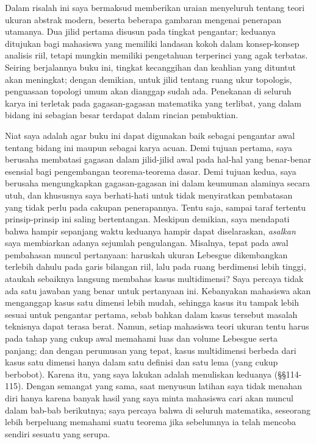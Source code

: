 \def\volumename{Landasan yang luas}
     
\bigskip
     
 Dalam risalah ini saya bermaksud memberikan
uraian menyeluruh tentang teori ukuran abstrak modern, beserta beberapa
gambaran mengenai penerapan utamanya.   Dua jilid pertama disusun pada
tingkat pengantar;  keduanya ditujukan bagi mahasiswa yang memiliki
landasan kokoh dalam konsep-konsep analisis riil, tetapi mungkin memiliki
pengetahuan terperinci yang agak terbatas.    Seiring berjalannya buku ini,
tingkat kecanggihan dan keahlian yang dituntut akan meningkat;  dengan
demikian, untuk jilid tentang ruang ukur topologis, penguasaan topologi umum
akan dianggap sudah ada.
Penekanan di seluruh karya ini terletak pada gagasan-gagasan matematika yang
terlibat, yang dalam bidang ini sebagian besar terdapat dalam rincian
pembuktian.
     
Niat saya adalah agar buku ini dapat digunakan baik sebagai pengantar
awal tentang bidang ini maupun sebagai karya acuan.   Demi tujuan pertama,
saya berusaha membatasi gagasan dalam jilid-jilid awal pada hal-hal yang
benar-benar esensial bagi pengembangan teorema-teorema dasar.
Demi tujuan kedua, saya berusaha mengungkapkan gagasan-gagasan ini dalam
keumuman alaminya secara utuh, dan khususnya saya berhati-hati untuk tidak
menyiratkan pembatasan yang tidak perlu pada cakupan penerapannya.   Tentu
saja, sampai taraf tertentu prinsip-prinsip ini saling bertentangan.
Meskipun demikian, saya mendapati bahwa hampir sepanjang waktu keduanya
hampir dapat diselaraskan, {\it asalkan} saya membiarkan adanya sejumlah
pengulangan.   Misalnya, tepat pada awal pembahasan muncul pertanyaan:
haruskah ukuran Lebesgue dikembangkan terlebih dahulu pada garis bilangan
riil, lalu pada ruang berdimensi lebih tinggi, ataukah sebaiknya langsung
membahas kasus multidimensi?   Saya percaya tidak ada satu jawaban yang benar
untuk pertanyaan ini.   Kebanyakan mahasiswa akan menganggap kasus satu
dimensi lebih mudah, sehingga kasus itu tampak lebih sesuai untuk pengantar
pertama, sebab bahkan dalam kasus tersebut masalah teknisnya dapat terasa
berat.   Namun, setiap mahasiswa teori ukuran tentu harus pada tahap yang
cukup awal
memahami luas dan volume Lebesgue serta panjang;
dan dengan perumusan yang tepat, kasus multidimensi berbeda dari kasus satu
dimensi hanya dalam satu definisi dan satu lema (yang cukup berbobot).
Karena itu, yang saya lakukan adalah menuliskan keduanya (\S\S114-115).
Dengan semangat yang sama, saat menyusun latihan saya tidak menahan diri
hanya karena banyak hasil yang saya minta mahasiswa cari akan muncul
dalam bab-bab berikutnya;  saya percaya bahwa di seluruh matematika, seseorang
lebih berpeluang memahami suatu teorema jika sebelumnya ia telah mencoba
sendiri sesuatu yang serupa.
     
